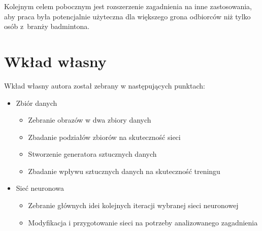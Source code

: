 Kolejnym celem pobocznym jest rozszerzenie zagadnienia na inne zastosowania, aby praca była potencjalnie użyteczna dla większego grona odbiorców niż tylko osób z~branży badmintona.
\\

\section{Wkład własny}

Wkład własny autora został zebrany w następujących punktach:

\begin{itemize}
	\item Zbiór danych
    \begin{itemize}
      \item Zebranie obrazów w dwa zbiory danych 
      \item Zbadanie podziałów zbiorów na skuteczność sieci 
			\item Stworzenie generatora sztucznych danych 
			\item Zbadanie wpływu sztucznych danych na skuteczność treningu 
		\end{itemize}
	\item Sieć neuronowa
	\begin{itemize}
		\item Zebranie głównych idei kolejnych iteracji wybranej sieci neuronowej 
		\item Modyfikacja i przygotowanie sieci na potrzeby analizowanego zagadnienia 
	\end{itemize}
\end{itemize}
